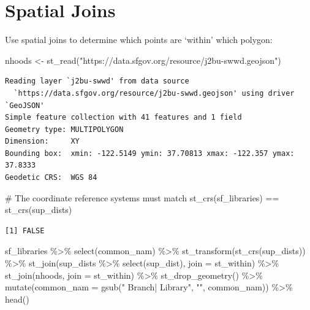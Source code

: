 \documentclass[
  letterpaper,
  DIV=11,
  numbers=noendperiod]{scrreprt}
\newenvironment{Shaded}{\begin{snugshade}}{\end{snugshade}}
\newcommand{\AttributeTok}[1]{\textcolor[rgb]{0.40,0.45,0.13}{#1}}
\newcommand{\CommentTok}[1]{\textcolor[rgb]{0.37,0.37,0.37}{#1}}
\newcommand{\FunctionTok}[1]{\textcolor[rgb]{0.28,0.35,0.67}{#1}}
\newcommand{\NormalTok}[1]{\textcolor[rgb]{0.00,0.23,0.31}{#1}}
\newcommand{\OtherTok}[1]{\textcolor[rgb]{0.00,0.23,0.31}{#1}}
\newcommand{\SpecialCharTok}[1]{\textcolor[rgb]{0.37,0.37,0.37}{#1}}
\newcommand{\StringTok}[1]{\textcolor[rgb]{0.13,0.47,0.30}{#1}}
\begin{document}
\section{Spatial Joins}\label{spatial-joins}

Use spatial joins to determine which points are `within' which polygon:

\begin{Shaded}
\begin{Highlighting}[]
\NormalTok{nhoods }\OtherTok{\textless{}{-}} \FunctionTok{st\_read}\NormalTok{(}\StringTok{"https://data.sfgov.org/resource/j2bu{-}swwd.geojson"}\NormalTok{)}
\end{Highlighting}
\end{Shaded}

\begin{verbatim}
Reading layer `j2bu-swwd' from data source 
  `https://data.sfgov.org/resource/j2bu-swwd.geojson' using driver `GeoJSON'
Simple feature collection with 41 features and 1 field
Geometry type: MULTIPOLYGON
Dimension:     XY
Bounding box:  xmin: -122.5149 ymin: 37.70813 xmax: -122.357 ymax: 37.8333
Geodetic CRS:  WGS 84
\end{verbatim}

\begin{Shaded}
\begin{Highlighting}[]
\CommentTok{\# The coordinate reference systems must match}
\FunctionTok{st\_crs}\NormalTok{(sf\_libraries) }\SpecialCharTok{==} \FunctionTok{st\_crs}\NormalTok{(sup\_dists)}
\end{Highlighting}
\end{Shaded}

\begin{verbatim}
[1] FALSE
\end{verbatim}

\begin{Shaded}
\begin{Highlighting}[]
\NormalTok{sf\_libraries }\SpecialCharTok{\%\textgreater{}\%} 
  \FunctionTok{select}\NormalTok{(common\_nam) }\SpecialCharTok{\%\textgreater{}\%} 
  \FunctionTok{st\_transform}\NormalTok{(}\FunctionTok{st\_crs}\NormalTok{(sup\_dists)) }\SpecialCharTok{\%\textgreater{}\%} 
  \FunctionTok{st\_join}\NormalTok{(sup\_dists }\SpecialCharTok{\%\textgreater{}\%} \FunctionTok{select}\NormalTok{(sup\_dist), }\AttributeTok{join =}\NormalTok{ st\_within) }\SpecialCharTok{\%\textgreater{}\%} 
  \FunctionTok{st\_join}\NormalTok{(nhoods, }\AttributeTok{join =}\NormalTok{ st\_within) }\SpecialCharTok{\%\textgreater{}\%} 
  \FunctionTok{st\_drop\_geometry}\NormalTok{() }\SpecialCharTok{\%\textgreater{}\%} 
  \FunctionTok{mutate}\NormalTok{(}\AttributeTok{common\_nam =} \FunctionTok{gsub}\NormalTok{(}\StringTok{" Branch| Library"}\NormalTok{, }\StringTok{""}\NormalTok{, common\_nam)) }\SpecialCharTok{\%\textgreater{}\%} 
  \FunctionTok{head}\NormalTok{()}
\end{Highlighting}
\end{Shaded}
\end{document}
